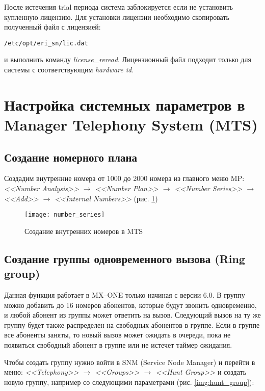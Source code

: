 После истечения trial периода система заблокируется если не установить купленную лицензию.
Для установки лицензии необходимо скопировать полученный файл с лицензией:
\begin{lstlisting}
/etc/opt/eri_sn/lic.dat
\end{lstlisting}

и выполнить команду {\em license\_reread}. Лицензионный файл подходит только для системы с соответствующим {\em hardware id}.


\section{Настройка системных параметров в Manager Telephony System (MTS)} \label{sec:mts}


\subsection{Создание номерного плана} \label{subsec:numbers}

Создадим внутренние номера от 1000 до 2000 номера из главного меню MP:
{\em <<Number Analysis>> $\rightarrow$ <<Number Plan>> $\rightarrow$ <<Number Series>> $\rightarrow$ <<Add>> $\rightarrow$ <<Internal Numbers>>} (рис. \ref{img:number_series})
\begin{figure}[!ht]
  \center
  \texttt{[image: number\_series]}
  \caption{Создание внутренних номеров в MTS}
  \label{img:number_series}
\end{figure}

\subsection{Создание группы одновременного вызова (Ring group)} \label{subsec:group}

Данная функция работает в MX--ONE только начиная с версии 6.0. В группу можно добавить до 16 номеров абонентов, которые будут звонить одновременно, и любой абонент из группы может ответить на вызов. Следующий вызов на ту же группу будет также распределен на свободных абонентов в группе. Если в группе все абоненты заняты, то новый вызов может ожидать в очереди, пока не появиться свободный абонент в группе или не истечет таймер ожидания.

Чтобы создать группу нужно войти в SNM (Service Node Manager) и перейти в меню: {\em <<Telephony>>  $\rightarrow$ <<Groups>> $\rightarrow$ <<Hunt Group>>} и создать новую группу, например со следующими параметрами (рис. \ref{img:hunt_group}):

